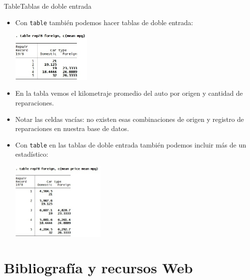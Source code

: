 \documentclass{beamer}
\begin{document}
\begin{frame}[allowframebreaks]{Table}{Tablas de doble entrada}
\begin{itemize}
\item Con \texttt{table} también podemos hacer tablas de doble entrada:
\centerline{\includegraphics[height=2.5cm]{table5.jpg}}
\item En la tabla vemos el kilometraje promedio del auto por origen y cantidad de reparaciones.
\item Notar las celdas vacías: no existen esas combinaciones de origen y registro de reparaciones en nuestra base de datos.
\item Con \texttt{table} en las tablas de doble entrada también podemos incluir más de un estadístico:\\
\medskip
\centerline{\includegraphics[height=3.9cm]{table6.jpg}}
\end{itemize}
\end{frame}

\section{Bibliografía y recursos Web}
\end{document}
